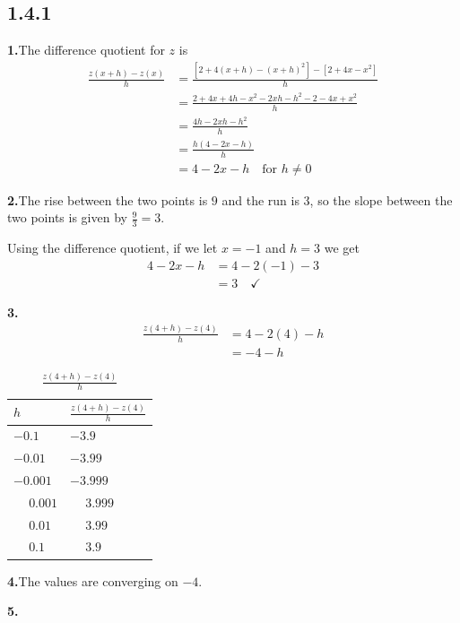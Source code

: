 \documentclass[10pt,oneside,]{book}
\theoremstyle{plain}
\theoremstyle{definition}
\numberwithin{equation}{section}
\newcommand{\fe}[2]{#1\mathopen{}\left(#2\right)\mathclose{}}
\begin{document}
\subsection*{1.4.1 }
\noindent\textbf{1.}\quad{}The difference quotient for \(z\) is \begin{align*}
\frac{\fe{z}{x+h}-\fe{z}{x}}{h}&=\frac{\left[2+4(x+h)-(x+h)^2\right]-\left[2+4x-x^2\right]}{h}\\
&=\frac{2+4x+4h-x^2-2xh-h^2-2-4x+x^2}{h}\\
&=\frac{4h-2xh-h^2}{h}\\
&=\frac{h(4-2x-h)}{h}\\
&=4-2x-h\quad\text{for $h\neq0$}
\end{align*}%
\par\smallskip
\noindent\textbf{2.}\quad{}The rise between the two points is \(9\) and the run is \(3\), so the slope between the two points is given by \(\frac{9}{3}=3\).%
\par
Using the difference quotient, if we let \(x=-1\) and \(h=3\) we get\begin{align*}
4-2x-h&=4-2(-1)-3\\
&=3\quad\checkmark
\end{align*}%
\par\smallskip
\noindent\textbf{3.}\quad{}\begin{align*}
\frac{\fe{z}{4+h}-\fe{z}{4}}{h}&=4-2(4)-h\\
&=-4-h
\end{align*}%
\begin{table}
\centering
\caption{\(\frac{\fe{z}{4+h}-\fe{z}{4}}{h}\)\label{table-4}}
\begin{tabular}{ll}
\toprule
\(h\)&\(\frac{\fe{z}{4+h}-\fe{z}{4}}{h}\)\\
\midrule
\(-0.1\)&\(-3.9\)\\
\(-0.01\)&\(-3.99\)\\
\(-0.001\)&\(-3.999\)\\
\(\phantom{-}0.001\)&\(\phantom{-}3.999\)\\
\(\phantom{-}0.01\)&\(\phantom{-}3.99\)\\
\(\phantom{-}0.1\)&\(\phantom{-}3.9\)\\
\bottomrule
\end{tabular}
\end{table}
\par\smallskip
\noindent\textbf{4.}\quad{}The values are converging on \(-4\).%
\par\smallskip
\noindent\textbf{5.}
\end{document}

